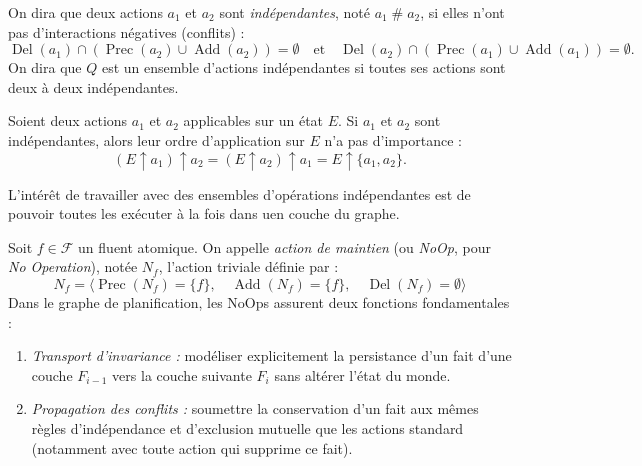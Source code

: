 \begin{definition}[Indépendance]
    On dira que deux actions $a_1$ et $a_2$ sont \emph{indépendantes}, noté $a_1 \mathrel{\#} a_2$,  si elles n'ont pas d'interactions négatives (conflits) : 
    \begin{equation}
        \operatorname{Del}(a_1) \cap \left( \operatorname{Prec}(a_2) \cup \operatorname{Add}(a_2)\right) = \emptyset
        \quad \text{et} \quad 
        \operatorname{Del}(a_2) \cap \left( \operatorname{Prec}(a_1) \cup \operatorname{Add}(a_1)\right) = \emptyset. 
    \end{equation}
    On dira que $ Q$ est un ensemble d'actions indépendantes si toutes ses actions sont deux à deux indépendantes. 
\end{definition}

\begin{prop}[Indépendance]
    Soient deux actions $a_1$ et $a_2$ applicables sur un état $E$. Si $a_1$ et $a_2$ sont indépendantes, alors leur ordre d'application sur $E$ n'a pas d'importance : 
    \begin{equation}
        (E \uparrow a_1) \uparrow a_2 = (E \uparrow a_2) \uparrow a_1 = E \uparrow \{a_1, a_2\}. 
    \end{equation}
\end{prop}

L'intérêt de travailler avec des ensembles d'opérations indépendantes est de pouvoir toutes les exécuter à la fois dans uen couche du graphe. 


\begin{definition}
    Soit $f \in \mathcal{F}$ un fluent atomique. On appelle \emph{action de maintien} (ou \emph{NoOp}, pour \emph{No Operation}), notée $N_f$, l'action triviale définie par :
    \begin{equation}
        N_f = \big\langle \operatorname{Prec}(N_f) = \{f\}, \quad \operatorname{Add}(N_f) = \{f\}, \quad \operatorname{Del}(N_f) = \emptyset \big\rangle
    \end{equation}
    Dans le graphe de planification, les NoOps assurent deux fonctions fondamentales :
    \begin{enumerate}
        \item \emph{Transport d'invariance :} modéliser explicitement la persistance d'un fait d'une couche $F_{i-1}$ vers la couche suivante $F_i$ sans altérer l'état du monde.
        \item \emph{Propagation des conflits :} soumettre la conservation d'un fait aux mêmes règles d'indépendance et d'exclusion mutuelle que les actions standard (notamment avec toute action qui supprime ce fait).
    \end{enumerate}
\end{definition}

